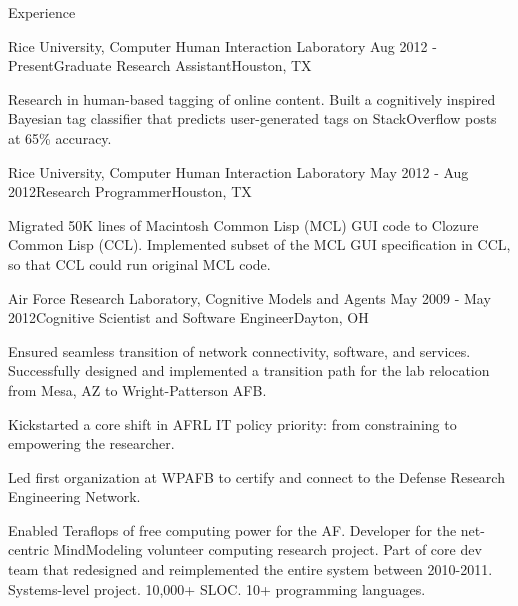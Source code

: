 
\begin{rSection}{Experience}

  \begin{rSubsection}{Rice University, Computer Human Interaction Laboratory}
    {Aug 2012 - Present}{Graduate Research Assistant}{Houston, TX}
  \item Research in human-based tagging of online content.
    Built a cognitively inspired Bayesian tag classifier that predicts user-generated tags on StackOverflow posts at 65\% accuracy.
  \end{rSubsection}

  \begin{rSubsection}{Rice University, Computer Human Interaction Laboratory}
    {May 2012 - Aug 2012}{Research Programmer}{Houston, TX}
  \item Migrated 50K lines of Macintosh Common Lisp (MCL) GUI code to Clozure Common Lisp (CCL).
    Implemented subset of the MCL GUI specification in CCL, so that CCL could run original MCL code.
  \end{rSubsection}

  \begin{rSubsection}{Air Force Research Laboratory, Cognitive Models and Agents}
    {May 2009 - May 2012}{Cognitive Scientist and Software Engineer}{Dayton, OH}
  \item
    Ensured seamless transition of network connectivity, software, and services.
    Successfully designed and implemented a transition path for the lab relocation from Mesa, AZ to Wright-Patterson AFB. 
  \item 
    Kickstarted a core shift in AFRL IT policy priority: from constraining to empowering the researcher.
  \item
    Led first organization at WPAFB to certify and connect to the Defense Research Engineering Network.
  \item 
    Enabled Teraflops of free computing power for the AF.
    Developer for the net-centric MindModeling volunteer computing research project.
    Part of core dev team that redesigned and reimplemented the entire system between 2010-2011.
    Systems-level project. 10,000+ SLOC. 10+ programming languages. 
  \end{rSubsection}


\end{rSection}
